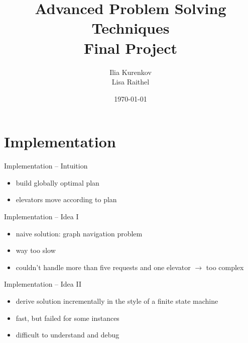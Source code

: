 \documentclass{beamer}
\title{Advanced Problem Solving Techniques\\Final Project}
\date{\today}
\author{Ilia Kurenkov\\Lisa Raithel}
\institute{University of Potsdam\\MSc. Cognitive Systems}
\begin{document}
  \maketitle

  \section{Implementation}

  \begin{frame}{Implementation -- Intuition}

    \begin{itemize}
    	\item build globally optimal plan
    	\item elevators move according to plan
    \end{itemize}

  \end{frame}

  \begin{frame}{Implementation -- Idea I}

    \begin{itemize}
    	\item naive solution: graph navigation problem
    	\item way too slow
    	\item couldn't handle more than five requests and one elevator $\rightarrow$ too complex
    \end{itemize}

  \end{frame}



\begin{frame}{Implementation -- Idea II}

    \begin{itemize}
    	\item derive solution incrementally in the style of a finite state machine
    	\item fast, but failed for some instances
    	\item difficult to understand and debug

    \end{itemize}

\end{frame}
\end{document}
